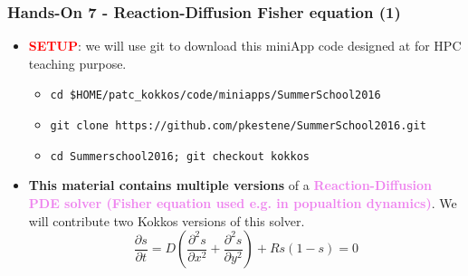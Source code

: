 \begin{frame}
  \frametitle{Hands-On 7 - Reaction-Diffusion Fisher equation (1)}

  \begin{itemize}
  \item \textcolor{red}{\textbf{SETUP}}: we will use git to download this miniApp code designed at  for HPC teaching purpose.
    \begin{itemize}
    \item \texttt{cd \$HOME/patc\_kokkos/code/miniapps/SummerSchool2016}
    \item \texttt{git clone https://github.com/pkestene/SummerSchool2016.git}
    \item \texttt{cd Summerschool2016; git checkout kokkos}
    \end{itemize}
  \item \textbf{This material contains multiple versions} of a \textcolor{violet}{\textbf{Reaction-Diffusion PDE solver (Fisher equation used e.g. in popualtion dynamics)}}. We will contribute two Kokkos versions of this solver.
    $$ \frac{\partial s}{\partial t} = D \left( \frac{\partial^2 s}{\partial x^2} + \frac{\partial^2 s}{\partial y^2} \right) + R s (1-s) = 0$$
  \end{itemize}
  
\end{frame}


